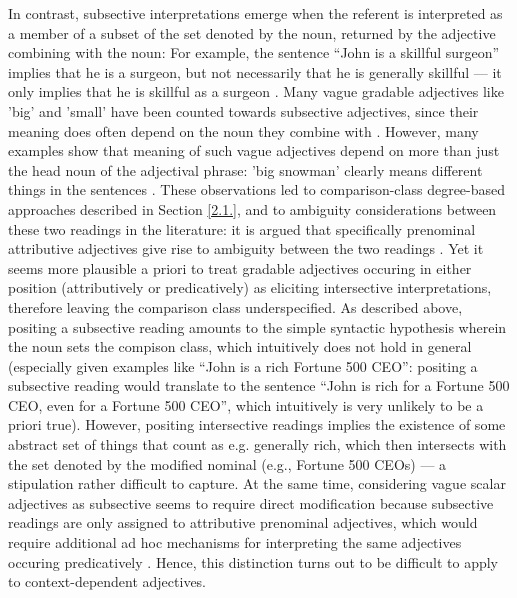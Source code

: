 In contrast, subsective interpretations emerge when the referent is interpreted as a member of a subset of the set denoted by the noun, returned by the adjective combining with the noun: For example, the sentence “John is a skillful surgeon” implies that he is a surgeon, but not necessarily that he is generally skillful --- it only implies that he is skillful as a surgeon \parencite{kennedy2012}. Many vague gradable adjectives like 'big' and 'small' have been counted towards subsective adjectives, since their meaning does often depend on the noun they combine with \parencite{sedivy1999}. However, many examples show that meaning of such vague adjectives depend on more than just the head noun of the adjectival phrase: 'big snowman' clearly means different things in the sentences \parencite['My 2-year-old son built a really tall snowman yesterday' and 'The D.U. fraternity brothers built a really tall snowman last weekend',][p.115]{sedivy1999}. These observations led to comparison-class degree-based approaches described in Section \ref{2.1.}, and to ambiguity considerations between these two readings in the literature: it is argued that specifically prenominal attributive adjectives give rise to ambiguity between the two readings \parencite[cf. ‘Olga is a beautiful dancer’][]{hofherr2010adjectives}. Yet it seems more plausible a priori to treat gradable adjectives occuring in either position (attributively or predicatively) as eliciting intersective interpretations, therefore leaving the comparison class underspecified. As described above, positing a subsective reading amounts to the simple syntactic hypothesis wherein the noun sets the compison class, which intuitively does not hold in general (especially given examples like “John is a rich Fortune 500 CEO”: positing a subsective reading would translate to the sentence “John is rich for a Fortune 500 CEO, even for a Fortune 500 CEO”, which intuitively is very unlikely to be a priori true). However, positing intersective readings implies the existence of some abstract set of things that count as e.g. generally rich, which then intersects with the set denoted by the modified nominal (e.g., Fortune 500 CEOs) --- a stipulation rather difficult to capture. At the same time, considering vague scalar adjectives as subsective seems to require direct modification because subsective readings are only assigned to attributive prenominal adjectives, which would require additional ad hoc mechanisms for interpreting the same adjectives occuring predicatively \parencite[cf.][]{hofherr2010adjectives}. Hence, this distinction turns out to be difficult to apply to context-dependent adjectives. 

